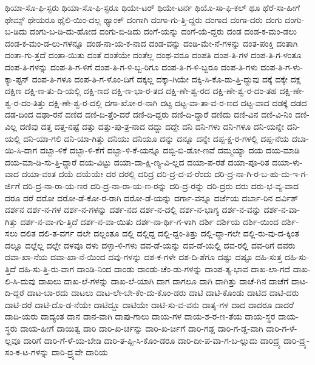 {ಥಿಯಾ-ಸೊ-ಫಿ-ಸ್ಟರು
ಥಿಯಾ-ಸೊ-ಫಿ-ಸ್ಟರೂ
ಥಿಯೇ-ಟರ್
ಥಿಯೇ-ಟರ್ನ
ಥಿಯೊ-ಸಾ-ಫಿ-ಕಲ್
ಥೂ
ಥೆರೆ-ಸಾ-ಹೀಗೆ
ಥೇಮ್ಸ್
ಥೇಯರೂ
ಥೈಲಿ-ಯಿಂ-ದಲ್ಲ
ಥ್ಯಾಂಕ್
ದಂಗಾಗಿ
ದಂಗಾ-ಗು-ತ್ತಿ-ದ್ದರು
ದಂಗಾದ
ದಂಗಾ-ದರು
ದಂಗು
ದಂಗು-ಬ-ಡಿದು
ದಂಗು-ಬ-ಡಿ-ದು-ಹೋದ
ದಂಗು-ಬಿ-ಡಿದು
ದಂಗೆ-ಯನ್ನು
ದಂಗೆ-ಯೆ-ದ್ದರು
ದಂಡ
ದಂಡ-ಕ-ಮಂ-ಡಲು
ದಂಡ-ಕ-ಮಂ-ಡ-ಲು-ಗಳನ್ನೂ
ದಂಡ-ನಾ-ಯ-ಕ-ನಾದ
ದಂಡ-ವನ್ನು
ದಂಡಿ-ಮೇ-ನೆ-ಗಳನ್ನು
ದಂತ-ಪಂಕ್ತಿ
ದಂತಾಗಿ
ದಂತಾ-ಗು-ತ್ತದೆ
ದಂತಾ-ಯಿತು
ದಂತೆ
ದಂತೆಯೇ
ದಂತೆಲ್ಲ
ದಂಥ-ವರೂ
ದಂಪತಿ
ದಂಪ-ತಿ-ಗಳ
ದಂಪ-ತಿ-ಗ-ಳಂತೂ
ದಂಪ-ತಿ-ಗಳನ್ನು
ದಂಪ-ತಿ-ಗ-ಳಿಗೆ
ದಂಪ-ತಿ-ಗ-ಳಿ-ಬ್ಬ-ರಿಗೂ
ದಂಪ-ತಿ-ಗ-ಳಿ-ಬ್ಬರೂ
ದಂಪ-ತಿ-ಗಳು
ದಂಪ-ತಿ-ಗ-ಳು-ಕ್ಯಾ-ಪ್ಟನ್
ದಂಪ-ತಿ-ಗಳೂ
ದಂಪ-ತಿ-ಗ-ಳೊಂ-ದಿಗೆ
ದಕ್ಕಲ್ಲ
ದಕ್ಕಾ-ಗಿಯೇ
ದಕ್ಕಿ-ಸಿ-ಕೊ-ಡು-ತ್ತಿ-ದ್ದುವು
ದಕ್ಕೆ
ದಕ್ಕೇ
ದಕ್ಷ
ದಕ್ಷಿಣ
ದಕ್ಷಿ-ಣ-ತು-ದಿ-ಯಲ್ಲಿ
ದಕ್ಷಿ-ಣದ
ದಕ್ಷಿ-ಣ-ಭಾ-ರ-ತದ
ದಕ್ಷಿ-ಣೇ-ಶ್ವ-ರದ
ದಕ್ಷಿ-ಣೇ-ಶ್ವ-ರ-ದಂ-ತಹ
ದಕ್ಷಿ-ಣೇ-ಶ್ವ-ರ-ದಂ-ತಿತ್ತು
ದಕ್ಷಿ-ಣೇ-ಶ್ವ-ರ-ದಲ್ಲಿ
ದಗಾ-ಖೋ-ರ-ನಾಗಿ
ದಟ್ಟ
ದಟ್ಟ-ವಾ-ತಾ-ವ-ರ-ಣದ
ದಟ್ಟ-ವಾದ
ದಡಕ್ಕೆ
ದಡದ
ದಡ-ದಿಂದ
ದಢಾ-ರನೆ
ದಣಿದ
ದಣಿ-ದಿ-ತ್ತೆಂ-ದರೆ
ದಣಿ-ದಿ-ದ್ದರು
ದಣಿ-ದಿ-ದ್ದಾರೆ
ದಣಿದು
ದಣಿ-ವಿನ
ದಣಿ-ವಿ-ನಿಂ
ದಣಿ-ವಿಲ್ಲ
ದಣಿವು
ದತ್ತ
ದತ್ತ-ನಷ್ಟೆ
ದತ್ತು
ದತ್ತು-ಪು-ತ್ರ-ನಾದ
ದದ್ದು
ದದ್ದೇ
ದನಿ
ದನಿ-ಗಳು
ದನಿ-ಗಳೂ
ದನಿ-ಯನ್ನೇ
ದನಿ-ಯಲ್ಲಿ
ದನಿ-ಯಾ-ಗಲಿ
ದನಿ-ಯಾ-ಗಿತ್ತು
ದನಿಯು
ದನಿಯೂ
ದನ್ನು
ದನ್ನೂ
ದನ್ನೇ
ದಪ್ಪ-ಕ್ಷ-ರ-ಗಳಲ್ಲಿ
ದಪ್ಪ-ನೆಯ
ದಬಾ-ಯಿ-ಸಿ-ದಾಗ
ದಬ್ಬಾ-ಳಿಕೆ
ದಬ್ಬಾ-ಳಿ-ಕೆಗೆ
ದಬ್ಬಾ-ಳಿ-ಕೆ-ಯನ್ನೂ
ದಬ್ಬಿ-ಬಿ-ಡೋ-ಣವೆ
ದಮ್ಮಯ್ಯಾ
ದಯ
ದಯ-ಮಾಡಿ
ದಯ-ಮಾ-ಡಿ-ಸು-ತ್ತಿ-ದ್ದಾರೆ
ದಯ-ವಿಟ್ಟು
ದಯಾ-ದಾ-ಕ್ಷಿ-ಣ್ಯ-ವಿ-ಲ್ಲದ
ದಯಾ-ಪ-ರತೆ
ದಯಾ-ಪೂ-ರಿತ
ದಯಾ-ಳು-ವಾದ
ದಯಾ-ವಂತ
ದಯೆ
ದಯೆಯೇ
ದರ
ದರಲ್ಲಿ
ದರಿದ್ರ
ದರಿ-ದ್ರ-ದ-ವ-ರೆಂದು
ದರಿ-ದ್ರ-ನಾ-ಗಿ-ರ-ಬ-ಹು-ದು-ಇ-ಗ-ರ್ಜಿಗೆ
ದರಿ-ದ್ರ-ನಾ-ರಾ-ಯ-ಣರ
ದರಿ-ದ್ರ-ನಾ-ರಾ-ಯ-ಣ-ರನ್ನು
ದರಿ-ದ್ರ-ರನ್ನು
ದರಿ-ದ್ರರು
ದರು
ದರು-ಭ-ವ್ಯ-ವಾದ
ದರೂ
ದರೆ
ದರೋ
ದರೋ-ಡೆ-ಕೋ-ರ-ರಾಗಿ
ದರೋ-ಡೆ-ಯನ್ನು
ದರ್ಗಾ-ವನ್ನೂ
ದರ್ಜೆಯ
ದರ್ಬಾ-ರಿನ
ದರ್ವಿಶ್
ದರ್ಶನ
ದರ್ಶ-ನ-ಗಳ
ದರ್ಶ-ನ-ಗಳನ್ನು
ದರ್ಶ-ನದ
ದರ್ಶ-ನ-ದಲ್ಲಿ
ದರ್ಶ-ನ-ಭಾಗ್ಯ
ದರ್ಶ-ನ-ವನ್ನು
ದರ್ಶ-ನ-ವಾ-ಗಿತ್ತು
ದರ್ಶ-ನ-ವಾ-ಗು-ತ್ತಿದೆ
ದರ್ಶ-ನ-ವಾ-ಯಿತು
ದರ್ಶ-ನಾ-ರ್ಥಿ-ಗ-ಳಾಗಿ
ದರ್ಶಿ
ದರ್ಶಿಯ
ದರ್ಶಿ-ಯಿಂದ
ದರ್ಶಿ-ಸಲು
ದಲಿತ
ದಲಿ-ತ-ವರ್ಗ
ದಲೇ
ದಲ್ಲಂತೂ
ದಲ್ಲಿ
ದಲ್ಲಿದ್ದ
ದಲ್ಲಿ-ದ್ದಂ-ತಿತ್ತು
ದಲ್ಲಿ-ದ್ದಾ-ಗಲೇ
ದಲ್ಲಿ-ರು-ವು-ದ-ಕ್ಕಿಂತ
ದಲ್ಲೂ
ದಲ್ಲೆಲ್ಲ
ದಲ್ಲೇ
ದಳವೂ
ದಳು
ದಳ್ಳಾ-ಳಿ-ಗಳು
ದವ-ಡೆ-ಯನ್ನು
ದವ-ಡೆ-ಯಲ್ಲಿ
ದವ-ರಲ್ಲಿ
ದವ-ರಿಗೆ
ದವರು
ದವಾ-ಖಾ-ನೆಯ
ದವಾ-ಖಾ-ನೆ-ಯಿಂದ
ದವು-ಗಳನ್ನು
ದಶ-ಕ-ಗಳೇ
ದಶ-ದಿ-ಶೆಗೂ
ದಷ್ಟು
ದಷ್ಟೂ
ದಹಿ-ಸುತ್ತ
ದಹಿ-ಸು-ತ್ತಿದೆ
ದಹಿ-ಸು-ತ್ತಿ-ರು-ವಾಗ
ದಾಂಡಿ-ನಿಂದ
ದಾಂಡು
ದಾಂಡು-ಚೆಂ-ಡು-ಗಳನ್ನು
ದಾಂಪ-ತ್ಯ-ಭಾವ
ದಾಖ-ಲಾ-ಗದೆ
ದಾಖ-ಲಿ-ಸಿ-ದುವು
ದಾಖಲು
ದಾಖ-ಲೆ-ಗಳನ್ನು
ದಾಖ-ಲೆ-ಯಾಗಿ
ದಾಗ
ದಾಗಲೂ
ದಾಗಿ
ದಾಗಿತ್ತು
ದಾಚೆ-ಗಿನ
ದಾಚೆಗೆ
ದಾಟ-ದಿ-ದ್ದರೆ
ದಾಟ-ಬಾ-ರದು
ದಾಟಲು
ದಾಟ-ಲೇ-ಬೇ-ಕೆಂ-ದು-ಕೊಂ-ಡರು
ದಾಟಿ
ದಾಟಿ-ಕೊಂಡು
ದಾಟಿದ
ದಾಟಿ-ದರು
ದಾಟಿ-ದರೆ
ದಾಟಿ-ದೊ-ಡ-ನೆಯೇ
ದಾಟಿದ್ದೂ
ದಾಟಿಯೇ
ದಾಟಿ-ಸು-ವ-ವನು
ದಾತೃ-ಗಳ
ದಾದ
ದಾದರೂ
ದಾದರೆ
ದಾದಿ-ಯರು
ದಾದ್ಯಂತ
ದಾನ
ದಾನ-ವಾಗಿ
ದಾಪು-ಗಾಲು
ದಾಯ-ಗಳ
ದಾಯ-ಶ-ರ-ಣ-ತೆಯ
ದಾಯ-ಸ್ಥರ
ದಾಯ-ಸ್ಥರು
ದಾಯ-ಹೀಗೆ
ದಾಯಿತ್ವ
ದಾರಿ
ದಾರಿ-ಖ-ರ್ಚನ್ನು
ದಾರಿ-ಖ-ರ್ಚಿಗೆ
ದಾರಿ-ಗಡ್ಡ
ದಾರಿ-ಗ-ಡ್ಡ-ವಾಗಿ
ದಾರಿ-ಗ-ಳೆ-ಲ್ಲವೂ
ದಾರಿಗೆ
ದಾರಿ-ಗೆ-ಳೆ-ಯ-ಬೇಡಿ
ದಾರಿ-ತ-ಪ್ಪಿ-ಸಿ-ಕೊಂ-ಡರೂ
ದಾರಿ-ದೀ-ಪ-ವಾ-ಗ-ಬ-ಲ್ಲುದು
ದಾರಿದ್ರ್ಯ
ದಾರಿ-ದ್ರ್ಯ-ಸಂ-ಕ-ಟ-ಗಳನ್ನು
ದಾರಿ-ದ್ರ್ಯವೇ
ದಾರಿಯ
}
